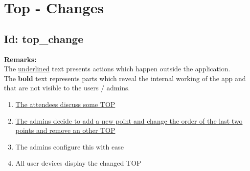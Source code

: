 \documentclass{article}
\begin{document}
\section*{Top - Changes}
\subsection*{Id: top\_change}
\noindent
\textbf{Remarks:}\\
 The \underline{underlined} text presents actions which happen outside the application. \\
 The \textbf{bold} text represents parts which reveal the internal working of the app and that are not visible to the users / admins.
\begin{enumerate}
	\item \underline{The attendees discuss some TOP}
	\item \underline{The admins decide to add a new point and change the order of the last two points and remove an other TOP} 
	\item The admins configure this with ease
	\item All user devices display the changed TOP
\end{enumerate}
\end{document}
